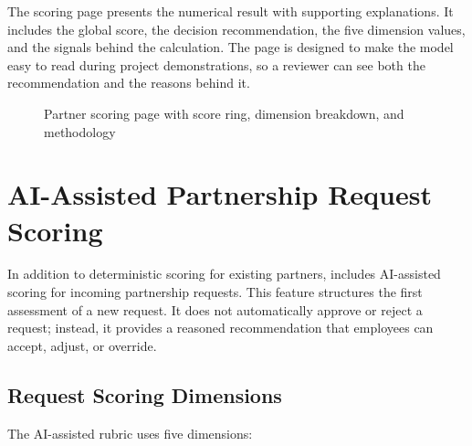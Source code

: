 The scoring page presents the numerical result with supporting explanations. It includes the global score, the decision recommendation, the five dimension values, and the signals behind the calculation. The page is designed to make the model easy to read during project demonstrations, so a reviewer can see both the recommendation and the reasons behind it.

\begin{figure}[htbp]
  \caption{Partner scoring page with score ring, dimension breakdown, and methodology}
  \label{fig:chapter7-scoring-page-screenshot}
\end{figure}

\section{AI-Assisted Partnership Request Scoring}
\label{sec:chapter7-request-scoring}

In addition to deterministic scoring for existing partners, \projectname{} includes AI-assisted scoring for incoming partnership requests. This feature structures the first assessment of a new request. It does not automatically approve or reject a request; instead, it provides a reasoned recommendation that employees can accept, adjust, or override.

\subsection{Request Scoring Dimensions}
\label{subsec:chapter7-request-scoring-dimensions}

The AI-assisted rubric uses five dimensions:

